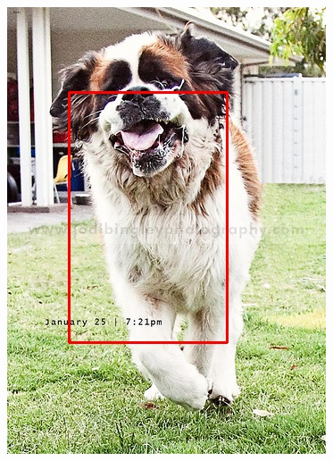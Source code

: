 \documentclass[conference,compsoc]{IEEEtran}
\begin{document}
\begin{figure}
\begin{multicols}{4}
    		\includegraphics[height=1.35\linewidth]{terrible1.jpg}\par

\end{multicols}
\end{figure}
\end{document}
